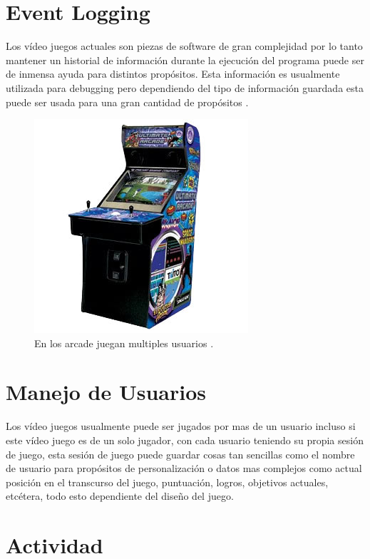 \section{Event Logging}
Los vídeo juegos actuales son piezas de software de gran complejidad por lo tanto mantener un historial de información durante la ejecución del programa puede ser de inmensa ayuda para distintos propósitos. Esta información es usualmente utilizada para debugging pero dependiendo del tipo de información guardada esta puede ser usada para una gran cantidad de propósitos \cite{colm_tracing}.
\newpage
\setlength\intextsep{0pt}
\begin{figure}
\includegraphics[width=\linewidth]{semana7/arcade-machines.jpg}
\caption{En los arcade juegan multiples usuarios \cite{arcade_score}.}
\label{fig:arcade}
\end{figure}
\section{Manejo de Usuarios}
Los vídeo juegos usualmente puede ser jugados por mas de un usuario incluso si este vídeo juego es de un solo jugador, con cada usuario teniendo su propia sesión de juego, esta sesión de juego puede guardar cosas tan sencillas como el nombre de usuario para propósitos de personalización o datos mas complejos como actual posición en el transcurso del juego, puntuación, logros, objetivos actuales, etcétera, todo esto dependiente del diseño del juego.

\section{Actividad}
